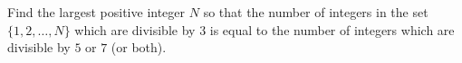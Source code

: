 Find the largest positive integer $N$ so that the number of integers in the set $\{1,2,\dots,N\}$ which are divisible by $3$ is equal to the number of integers which are divisible by $5$ or $7$ (or both).
